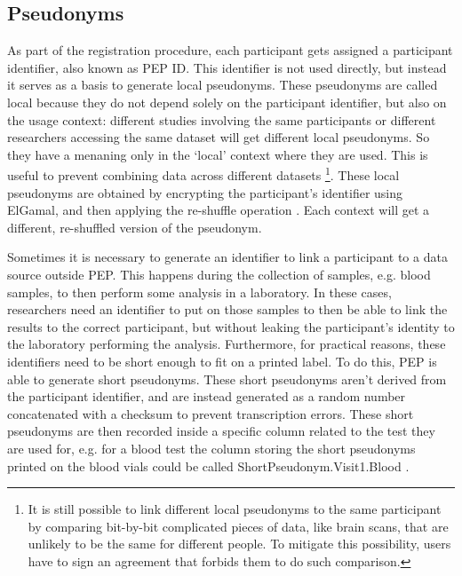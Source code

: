 \documentclass{report}
\begin{document}
\subsection{Pseudonyms}\label{pseudonyms}
As part of the registration procedure, each participant gets assigned a participant identifier, also known as PEP ID. This identifier is not used directly, but instead it serves as a 
basis to generate local pseudonyms. These pseudonyms are called local because they do not depend solely on the participant identifier, but also on the usage context: different studies 
involving the same participants or different researchers accessing the same dataset will get different local pseudonyms. So they have a menaning only in the \enquote*{local} context 
where they are used. This is useful to prevent combining data across different datasets \footnote{It is still possible to link different local pseudonyms to the same participant by 
comparing bit-by-bit complicated pieces of data, like brain scans, that are unlikely to be the same for different people. To  mitigate this possibility, users have to sign an agreement 
that forbids them to do such comparison.}. These local pseudonyms are obtained by encrypting the participant's identifier using ElGamal, and then applying the re-shuffle operation
\cite{pep-blueprint}. Each context will get a different, re-shuffled version of the pseudonym.\par
Sometimes it is necessary to generate an identifier to link a participant to a data source outside PEP. This happens during the collection of samples, e.g. blood samples, to then
perform some analysis in a laboratory. In these cases, researchers need an identifier to put on those samples to then be able to link the results to the correct participant, but
without leaking the participant's identity to the laboratory performing the analysis. Furthermore, for practical reasons, these identifiers need to be short enough to fit on a printed label. To do this, PEP is able to generate short
pseudonyms. These short pseudonyms aren't derived from the participant identifier, and are instead generated as a random number concatenated with a checksum to prevent
transcription errors. These short pseudonyms are then recorded inside a specific column related to the test they are used for, e.g. for a blood test the column storing the short
pseudonyms printed on the blood vials could be called ShortPseudonym.Visit1.Blood  \cite{pep-blueprint}.
\end{document}

